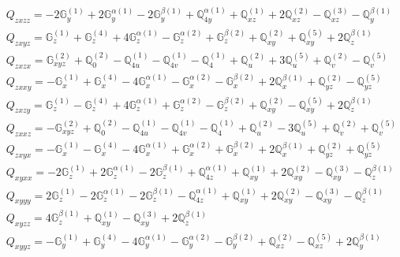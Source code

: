 \documentclass[fleqn,8pt,landscape]{jsarticle}
\begin{document}
\begin{align*}
& Q_{zxzz} = - 2 \mathbb{G}_{y}^{(1)} + 2 \mathbb{G}_{y}^{\alpha(1)} - 2 \mathbb{G}_{y}^{\beta(1)} + \mathbb{Q}_{4y}^{\alpha(1)} + \mathbb{Q}_{xz}^{(1)} + 2 \mathbb{Q}_{xz}^{(2)} - \mathbb{Q}_{xz}^{(3)} - \mathbb{Q}_{y}^{\beta(1)} \\
& Q_{zxyz} = \mathbb{G}_{z}^{(1)} + \mathbb{G}_{z}^{(4)} + 4 \mathbb{G}_{z}^{\alpha(1)} - \mathbb{G}_{z}^{\alpha(2)} + \mathbb{G}_{z}^{\beta(2)} + \mathbb{Q}_{xy}^{(2)} + \mathbb{Q}_{xy}^{(5)} + 2 \mathbb{Q}_{z}^{\beta(1)} \\
& Q_{zxzx} = \mathbb{G}_{xyz}^{(2)} + \mathbb{Q}_{0}^{(2)} - \mathbb{Q}_{4u}^{(1)} - \mathbb{Q}_{4v}^{(1)} - \mathbb{Q}_{4}^{(1)} + \mathbb{Q}_{u}^{(2)} + 3 \mathbb{Q}_{u}^{(5)} + \mathbb{Q}_{v}^{(2)} - \mathbb{Q}_{v}^{(5)} \\
& Q_{zxxy} = - \mathbb{G}_{x}^{(1)} + \mathbb{G}_{x}^{(4)} - 4 \mathbb{G}_{x}^{\alpha(1)} - \mathbb{G}_{x}^{\alpha(2)} - \mathbb{G}_{x}^{\beta(2)} + 2 \mathbb{Q}_{x}^{\beta(1)} + \mathbb{Q}_{yz}^{(2)} - \mathbb{Q}_{yz}^{(5)} \\
& Q_{zxzy} = \mathbb{G}_{z}^{(1)} - \mathbb{G}_{z}^{(4)} + 4 \mathbb{G}_{z}^{\alpha(1)} + \mathbb{G}_{z}^{\alpha(2)} - \mathbb{G}_{z}^{\beta(2)} + \mathbb{Q}_{xy}^{(2)} - \mathbb{Q}_{xy}^{(5)} + 2 \mathbb{Q}_{z}^{\beta(1)} \\
& Q_{zxxz} = - \mathbb{G}_{xyz}^{(2)} + \mathbb{Q}_{0}^{(2)} - \mathbb{Q}_{4u}^{(1)} - \mathbb{Q}_{4v}^{(1)} - \mathbb{Q}_{4}^{(1)} + \mathbb{Q}_{u}^{(2)} - 3 \mathbb{Q}_{u}^{(5)} + \mathbb{Q}_{v}^{(2)} + \mathbb{Q}_{v}^{(5)} \\
& Q_{zxyx} = - \mathbb{G}_{x}^{(1)} - \mathbb{G}_{x}^{(4)} - 4 \mathbb{G}_{x}^{\alpha(1)} + \mathbb{G}_{x}^{\alpha(2)} + \mathbb{G}_{x}^{\beta(2)} + 2 \mathbb{Q}_{x}^{\beta(1)} + \mathbb{Q}_{yz}^{(2)} + \mathbb{Q}_{yz}^{(5)} \\
& Q_{xyxx} = - 2 \mathbb{G}_{z}^{(1)} + 2 \mathbb{G}_{z}^{\alpha(1)} - 2 \mathbb{G}_{z}^{\beta(1)} + \mathbb{Q}_{4z}^{\alpha(1)} + \mathbb{Q}_{xy}^{(1)} + 2 \mathbb{Q}_{xy}^{(2)} - \mathbb{Q}_{xy}^{(3)} - \mathbb{Q}_{z}^{\beta(1)} \\
& Q_{xyyy} = 2 \mathbb{G}_{z}^{(1)} - 2 \mathbb{G}_{z}^{\alpha(1)} - 2 \mathbb{G}_{z}^{\beta(1)} - \mathbb{Q}_{4z}^{\alpha(1)} + \mathbb{Q}_{xy}^{(1)} + 2 \mathbb{Q}_{xy}^{(2)} - \mathbb{Q}_{xy}^{(3)} - \mathbb{Q}_{z}^{\beta(1)} \\
& Q_{xyzz} = 4 \mathbb{G}_{z}^{\beta(1)} + \mathbb{Q}_{xy}^{(1)} - \mathbb{Q}_{xy}^{(3)} + 2 \mathbb{Q}_{z}^{\beta(1)} \\
& Q_{xyyz} = - \mathbb{G}_{y}^{(1)} + \mathbb{G}_{y}^{(4)} - 4 \mathbb{G}_{y}^{\alpha(1)} - \mathbb{G}_{y}^{\alpha(2)} - \mathbb{G}_{y}^{\beta(2)} + \mathbb{Q}_{xz}^{(2)} - \mathbb{Q}_{xz}^{(5)} + 2 \mathbb{Q}_{y}^{\beta(1)} \\

\end{align*}
\end{document}
